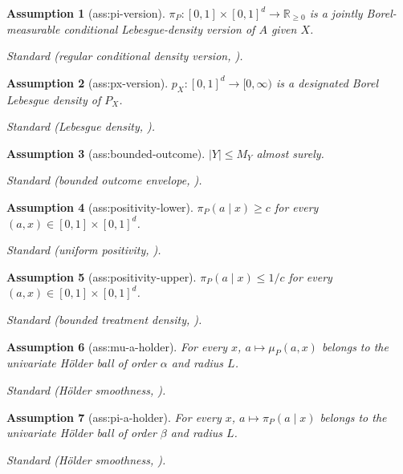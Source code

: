 \documentclass{article}
\newtheorem{assumption}{Assumption}
\begin{document}
\begin{assumption}[ass:pi-version]\label{ass:pi-version}
\(\pi_P:[0,1]\times[0,1]^d\to\mathbb R_{\ge0}\) is a jointly Borel-measurable conditional Lebesgue-density version of \(A\) given \(X\).
\par\smallskip\noindent\emph{Standard} (regular conditional density version, \cite{Tsybakov2009}).
\end{assumption}

\begin{assumption}[ass:px-version]\label{ass:px-version}
\(p_X:[0,1]^d\to[0,\infty)\) is a designated Borel Lebesgue density of \(P_X\).
\par\smallskip\noindent\emph{Standard} (Lebesgue density, \cite{Tsybakov2009}).
\end{assumption}

\begin{assumption}[ass:bounded-outcome]\label{ass:bounded-outcome}
\(\lvert Y\rvert\le M_Y\) almost surely.
\par\smallskip\noindent\emph{Standard} (bounded outcome envelope, \cite{BonviniKennedy2022FastDRF}).
\end{assumption}

\begin{assumption}[ass:positivity-lower]\label{ass:positivity-lower}
\(\pi_P(a\mid x)\ge c\) for every \((a,x)\in[0,1]\times[0,1]^d\).
\par\smallskip\noindent\emph{Standard} (uniform positivity, \cite{BonviniKennedy2022FastDRF}).
\end{assumption}

\begin{assumption}[ass:positivity-upper]\label{ass:positivity-upper}
\(\pi_P(a\mid x)\le1/c\) for every \((a,x)\in[0,1]\times[0,1]^d\).
\par\smallskip\noindent\emph{Standard} (bounded treatment density, \cite{BonviniKennedy2022FastDRF}).
\end{assumption}

\begin{assumption}[ass:mu-a-holder]\label{ass:mu-a-holder}
For every \(x\), \(a\mapsto\mu_P(a,x)\) belongs to the univariate Hölder ball of order \(\alpha\) and radius \(L\).
\par\smallskip\noindent\emph{Standard} (Hölder smoothness, \cite{Tsybakov2009}).
\end{assumption}

\begin{assumption}[ass:pi-a-holder]\label{ass:pi-a-holder}
For every \(x\), \(a\mapsto\pi_P(a\mid x)\) belongs to the univariate Hölder ball of order \(\beta\) and radius \(L\).
\par\smallskip\noindent\emph{Standard} (Hölder smoothness, \cite{Tsybakov2009}).
\end{assumption}
\end{document}
